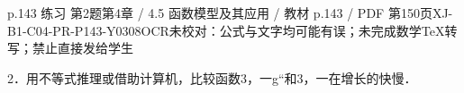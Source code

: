 \begin{bankitem}{p.143 练习 第2题}{第4章 / 4.5 函数模型及其应用 / 教材 p.143 / PDF 第150页}{XJ-B1-C04-PR-P143-Y0308}{OCR未校对：公式与文字均可能有误；未完成数学TeX转写；禁止直接发给学生}
\begin{ocrdraft}
\par
2．用不等式推理或借助计算机，比较函数3，一g“和3，一在增长的快慢．
\end{ocrdraft}
\end{bankitem}

